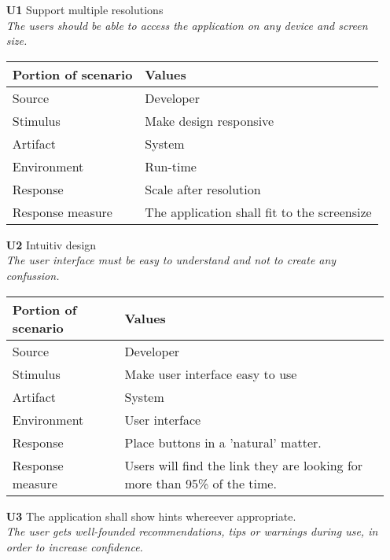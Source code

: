 \begin{itemize}
    \item[\textbf{U1}] Support multiple resolutions \\
    \textit{\small{The users should be able to access the application on any device and screen size.}}
        
    \begin{tabular}{| l | p{7cm} |}
        \hline
        \rowcolor[gray]{0.8}
        \textbf{Portion of scenario} & \textbf{Values} \\
        \hline
        Source & Developer \\
        Stimulus & Make design responsive \\
        Artifact & System \\
        Environment & Run-time \\
        Response & Scale after resolution  \\
        Response measure & The application shall fit to the screensize \\
        \hline
    \end{tabular}   

    \item[\textbf{U2}] Intuitiv design \\
    \textit{\small{The user interface must be easy to understand and not to create any confussion.}}
        
    \begin{tabular}{| l | p{7cm} |}
        \hline
        \rowcolor[gray]{0.8}
        \textbf{Portion of scenario} & \textbf{Values} \\
        \hline
        Source & Developer \\
        Stimulus & Make user interface easy to use \\
        Artifact & System \\
        Environment & User interface \\
        Response & Place buttons in a 'natural' matter. \\
        Response measure & Users will find the link they are looking for more than 95\% of the time. \\
        \hline
    \end{tabular}

    \item[\textbf{U3}] The application shall show hints whereever appropriate. \\
        \textit{\small{The user gets well-founded recommendations, tips or warnings during use, in order to increase confidence.}}
        

\end{itemize}
